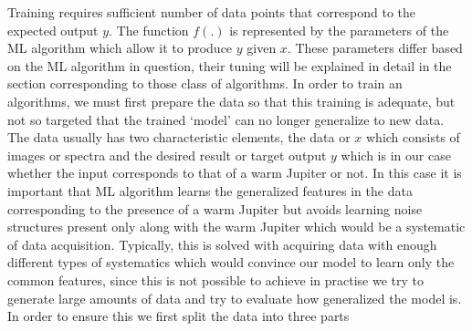 Training requires sufficient number of data points that correspond to the expected output $y$. 
The function $f(.)$ is represented by the parameters of the ML algorithm which allow it to produce $y$  given $x$. 
These parameters differ based on the ML algorithm in question, their tuning will be explained in detail in the section corresponding to those class of algorithms.
In order to train an algorithms, we must first prepare the data so that this training is adequate, but not so targeted that the trained `model' can no longer generalize to new data.
The data usually has two characteristic elements, the data or $x$ which consists of images or spectra and the desired result or target output $y$ which is in our case whether the input corresponds to that of a warm Jupiter or not.
In this case it is important that ML algorithm learns the generalized features in the data corresponding to the presence of a warm Jupiter but avoids learning noise structures present only along with the warm Jupiter which would be a systematic of data acquisition.
Typically, this is solved with acquiring data with enough different types of systematics which would convince our model to learn only the common features, since this is not possible to achieve in practise we try to generate large amounts of data and try to evaluate how generalized the model is.
In order to ensure this we first split the data into three parts
